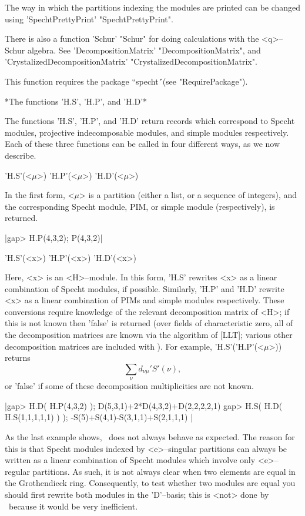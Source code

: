 The way in which the partitions indexing the modules are printed can 
be changed using 'SpechtPrettyPrint' "SpechtPrettyPrint".

There is also a function 'Schur' "Schur" for doing calculations with
the <q>--Schur algebra. See 'DecompositionMatrix' "DecompositionMatrix", 
and 'CrystalizedDecompositionMatrix' "CrystalizedDecompositionMatrix".

This function requires the package ``specht\'\'\ (see "RequirePackage").
\medskip

*The functions 'H.S', 'H.P', and 'H.D'*

The functions 'H.S', 'H.P', and 'H.D' return records which correspond
to Specht modules, projective indecomposable modules, and simple
modules respectively. Each of these three functions can be called in
four different ways, as we now describe.

\bigskip

'H.S'(<$\mu$>)  \qquad  'H.P'(<$\mu$>)  \qquad  'H.D'(<$\mu$>)

In the first form, <$\mu$> is a partition (either a list, or a sequence of
integers), and the corresponding Specht module, PIM, or simple module
(respectively), is returned.

|gap> H.P(4,3,2);
P(4,3,2)|

\bigskip

'H.S'(<x>)  \qquad  'H.P'(<x>)  \qquad  'H.D'(<x>)

Here, <x> is an <H>--module. In this form, 'H.S' rewrites <x> as a linear 
combination of Specht modules, if possible. Similarly, 'H.P' and 'H.D' 
rewrite <x> as a linear combination of PIMs and simple modules 
respectively. These conversions require knowledge of the relevant 
decomposition matrix of <H>; if this is not known then 'false' is 
returned (over fields of characteristic zero, all of the decomposition 
matrices are known via the algorithm of [LLT]; various other 
decomposition matrices are included with \Specht). For example, 
'H.S'('H.P'(<$\mu$>)) returns
          $$  \sum_\nu d_{\nu\mu} 'S'(\nu),  $$
or 'false' if some of these decomposition multiplicities are not known.

|gap> H.D( H.P(4,3,2) );
D(5,3,1)+2*D(4,3,2)+D(2,2,2,2,1)
gap> H.S( H.D( H.S(1,1,1,1,1) ) );
-S(5)+S(4,1)-S(3,1,1)+S(2,1,1,1) |

As the last example shows, \Specht\ does not always behave as expected.
The reason for this is that Specht modules indexed by <e>--singular 
partitions can always be written as a linear combination of Specht 
modules which involve only <e>--regular partitions. As such, it is not 
always clear when two elements are equal in the Grothendieck ring. 
Consequently, to test whether two modules are equal you should first 
rewrite both modules in the 'D'--basis; this is <not> done by \Specht\ 
because it would be very inefficient.

